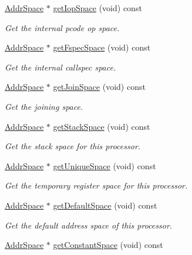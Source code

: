 \begin{DoxyCompactItemize}
\mbox{\hyperlink{class_addr_space}{Addr\+Space}} $\ast$ \mbox{\hyperlink{class_addr_space_manager_a2175a095b07fef420632724cacc10354}{get\+Iop\+Space}} (void) const
\begin{DoxyCompactList}\small\item\em Get the internal pcode op space. \end{DoxyCompactList}\item 
\mbox{\hyperlink{class_addr_space}{Addr\+Space}} $\ast$ \mbox{\hyperlink{class_addr_space_manager_a734131c0626a1cfbbfd3cb0e93ecba28}{get\+Fspec\+Space}} (void) const
\begin{DoxyCompactList}\small\item\em Get the internal callspec space. \end{DoxyCompactList}\item 
\mbox{\hyperlink{class_addr_space}{Addr\+Space}} $\ast$ \mbox{\hyperlink{class_addr_space_manager_addc2a210ade7c84962711a962e27dc32}{get\+Join\+Space}} (void) const
\begin{DoxyCompactList}\small\item\em Get the joining space. \end{DoxyCompactList}\item 
\mbox{\hyperlink{class_addr_space}{Addr\+Space}} $\ast$ \mbox{\hyperlink{class_addr_space_manager_a00f3afd0adb68f208c31a9716abe5a4f}{get\+Stack\+Space}} (void) const
\begin{DoxyCompactList}\small\item\em Get the stack space for this processor. \end{DoxyCompactList}\item 
\mbox{\hyperlink{class_addr_space}{Addr\+Space}} $\ast$ \mbox{\hyperlink{class_addr_space_manager_ab7428d74e76200ecc3c99a0e1ad7f613}{get\+Unique\+Space}} (void) const
\begin{DoxyCompactList}\small\item\em Get the temporary register space for this processor. \end{DoxyCompactList}\item 
\mbox{\hyperlink{class_addr_space}{Addr\+Space}} $\ast$ \mbox{\hyperlink{class_addr_space_manager_aec65c9fb56f10199463c70d5b6660b3f}{get\+Default\+Space}} (void) const
\begin{DoxyCompactList}\small\item\em Get the default address space of this processor. \end{DoxyCompactList}\item 
\mbox{\hyperlink{class_addr_space}{Addr\+Space}} $\ast$ \mbox{\hyperlink{class_addr_space_manager_ab7dec6a4f5671fffb5d5645ebd2cb1f4}{get\+Constant\+Space}} (void) const

\end{DoxyCompactItemize}
